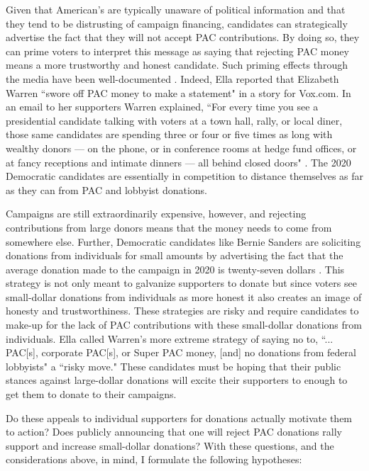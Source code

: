 \documentclass[12pt]{article}
\begin{document}
 Given that American's are typically unaware of political information and that they tend to be distrusting of campaign financing, candidates can strategically advertise the fact that they will not accept PAC contributions. By doing so, they can prime voters to interpret this message as saying that rejecting PAC money means a more trustworthy and honest candidate. Such priming effects through the media have been well-documented \citep{iyengar_news_1989}. Indeed, Ella \citet{nilsen_race_2019} reported that Elizabeth Warren ``swore off PAC money to make a statement" in a story for Vox.com. In an email to her supporters Warren explained, ``For every time you see a presidential candidate talking with voters at a town hall, rally, or local diner, those same candidates are spending three or four or five times as long with wealthy donors — on the phone, or in conference rooms at hedge fund offices, or at fancy receptions and intimate dinners — all behind closed doors" \citep{nilsen_race_2019}. The 2020 Democratic candidates are essentially in competition to distance themselves as far as they can from PAC and lobbyist donations. 
 
 Campaigns are still extraordinarily expensive, however, and rejecting contributions from large donors means that the money needs to come from somewhere else. Further, Democratic candidates like Bernie Sanders are soliciting donations from individuals for small amounts by advertising the fact that the average donation made to the campaign in 2020 is twenty-seven dollars \citep{gambino_not_2019}. This strategy is not only meant to galvanize supporters to donate but since voters see small-dollar donations from individuals as more honest \citep{bowler_campaign_2016} it also creates an image of honesty and trustworthiness. These strategies are risky and require candidates to make-up for the lack of PAC contributions with these small-dollar donations from individuals. Ella \citet{nilsen_race_2019} called Warren's more extreme strategy of saying no to, ``... PAC[s], corporate PAC[s], or Super PAC money, [and] no donations from federal lobbyists" a ``risky move." These candidates must be hoping that their public stances against large-dollar donations will excite their supporters to enough to get them to donate to their campaigns.
 
 Do these appeals to individual supporters for donations actually motivate them to action? Does publicly announcing that one will reject PAC donations rally support and increase small-dollar donations? With these questions, and the considerations above, in mind, I formulate the following hypotheses:
 
\end{document}
